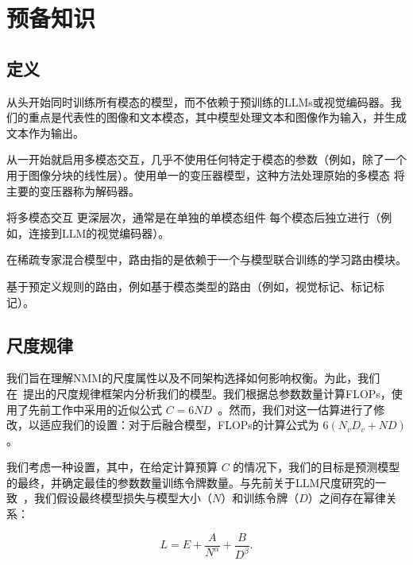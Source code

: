 \section{预备知识}

\subsection{定义}

从头开始同时训练所有模态的模型，而不依赖于预训练的LLMs或视觉编码器。我们的重点是代表性的图像和文本模态，其中模型处理文本和图像作为输入，并生成文本作为输出。

 从一开始就启用多模态交互，几乎不使用任何特定于模态的参数（例如，除了一个用于图像分块的线性层）。使用单一的变压器模型，这种方法处理原始的多模态   将主要的变压器称为解码器。

 将多模态交互  更深层次，通常是在单独的单模态组件  每个模态后独立进行（例如，连接到LLM的视觉编码器）。

 在稀疏专家混合模型中，路由指的是依赖于一个与模型联合训练的学习路由模块。

 基于预定义规则的路由，例如基于模态类型的路由（例如，视觉标记、标记标记）。


\subsection{尺度规律}
我们旨在理解NMM的尺度属性以及不同架构选择如何影响权衡。为此，我们在~\citet{kaplan2020scaling, hoffmann2022training}提出的尺度规律框架内分析我们的模型。我们根据总参数数量计算FLOPs，使用了先前工作中采用的近似公式 \(C = 6ND\)~\citep{hoffmann2022training,abnar2025parameters}。然而，我们对这一估算进行了修改，以适应我们的设置：对于后融合模型，FLOPs的计算公式为 \(6(N_vD_v + ND)\)。

我们考虑一种设置，其中，在给定计算预算 \(C\) 的情况下，我们的目标是预测模型的最终，并确定最佳的参数数量训练令牌数量。与先前关于LLM尺度研究的一致~\citep{hoffmann2022training}，我们假设最终模型损失与模型大小（\(N\)）和训练令牌（\(D\)）之间存在幂律关系：

\begin{equation}
\label{eq:scaling_laws}
    L = E + \frac{A}{N^{\alpha}} + \frac{B}{D^{\beta}}.
\end{equation}

